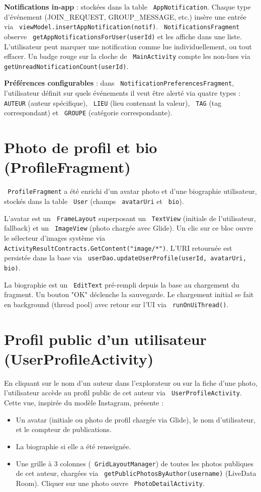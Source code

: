 \documentclass[a4paper,12pt,openany]{report}
\newcommand{\ic}[1]{\texttt{\small\colorbox{lightbg}{\color{navy!90} #1}}}
\begin{document}
\textbf{Notifications in-app} : stockées dans la table \ic{AppNotification}.
Chaque type d'événement (JOIN\_REQUEST, GROUP\_MESSAGE, etc.) insère une entrée
via \ic{viewModel.insertAppNotification(notif)}. \ic{NotificationsFragment}
observe \ic{getAppNotificationsForUser(userId)} et les affiche dans une liste.
L'utilisateur peut marquer une notification comme lue individuellement, ou
tout effacer. Un badge rouge sur la cloche de \ic{MainActivity} compte les
non-lues via \ic{getUnreadNotificationCount(userId)}.

\textbf{Préférences configurables} : dans \ic{NotificationPreferencesFragment},
l'utilisateur définit sur quels événements il veut être alerté via quatre types :
\ic{AUTEUR} (auteur spécifique), \ic{LIEU} (lieu contenant la valeur),
\ic{TAG} (tag correspondant) et \ic{GROUPE} (catégorie correspondante).


\section{Photo de profil et bio (ProfileFragment)}

\ic{ProfileFragment} a été enrichi d'un avatar photo et d'une biographie
utilisateur, stockés dans la table \ic{User} (champs \ic{avatarUri} et \ic{bio}).

L'avatar est un \ic{FrameLayout} superposant un \ic{TextView} (initiale de
l'utilisateur, fallback) et un \ic{ImageView} (photo chargée avec Glide).
Un clic sur ce bloc ouvre le sélecteur d'images système via
\ic{ActivityResultContracts.GetContent("image/*")}. L'URI retournée est persistée
dans la base via \ic{userDao.updateUserProfile(userId, avatarUri, bio)}.

La biographie est un \ic{EditText} pré-rempli depuis la base au chargement du
fragment. Un bouton "OK" déclenche la sauvegarde. Le chargement initial se fait
en background (thread pool) avec retour sur l'UI via \ic{runOnUiThread()}.

\section{Profil public d'un utilisateur (UserProfileActivity)}

En cliquant sur le nom d'un auteur dans l'explorateur ou sur la fiche d'une
photo, l'utilisateur accède au profil public de cet auteur via
\ic{UserProfileActivity}. Cette vue, inspirée du modèle Instagram, présente :

\begin{itemize}
  \item Un avatar (initiale ou photo de profil chargée via Glide), le nom
    d'utilisateur, et le compteur de publications.
  \item La biographie si elle a été renseignée.
  \item Une grille à 3 colonnes (\ic{GridLayoutManager}) de toutes les photos
    publiques de cet auteur, chargées via \ic{getPublicPhotosByAuthor(username)}
    (LiveData Room). Cliquer sur une photo ouvre \ic{PhotoDetailActivity}.
\end{itemize}
\end{document}
